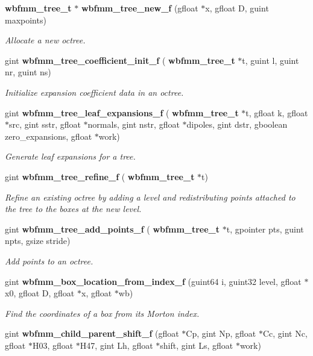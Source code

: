 \begin{DoxyCompactItemize}
\textbf{ wbfmm\+\_\+tree\+\_\+t} $\ast$ \textbf{ wbfmm\+\_\+tree\+\_\+new\+\_\+f} (gfloat $\ast$x, gfloat D, guint maxpoints)
\begin{DoxyCompactList}\small\item\em Allocate a new octree. \end{DoxyCompactList}\item 
gint \textbf{ wbfmm\+\_\+tree\+\_\+coefficient\+\_\+init\+\_\+f} (\textbf{ wbfmm\+\_\+tree\+\_\+t} $\ast$t, guint l, guint nr, guint ns)
\begin{DoxyCompactList}\small\item\em Initialize expansion coefficient data in an octree. \end{DoxyCompactList}\item 
gint \textbf{ wbfmm\+\_\+tree\+\_\+leaf\+\_\+expansions\+\_\+f} (\textbf{ wbfmm\+\_\+tree\+\_\+t} $\ast$t, gfloat k, gfloat $\ast$src, gint sstr, gfloat $\ast$normals, gint nstr, gfloat $\ast$dipoles, gint dstr, gboolean zero\+\_\+expansions, gfloat $\ast$work)
\begin{DoxyCompactList}\small\item\em Generate leaf expansions for a tree. \end{DoxyCompactList}\item 
gint \textbf{ wbfmm\+\_\+tree\+\_\+refine\+\_\+f} (\textbf{ wbfmm\+\_\+tree\+\_\+t} $\ast$t)
\begin{DoxyCompactList}\small\item\em Refine an existing octree by adding a level and redistributing points attached to the tree to the boxes at the new level. \end{DoxyCompactList}\item 
gint \textbf{ wbfmm\+\_\+tree\+\_\+add\+\_\+points\+\_\+f} (\textbf{ wbfmm\+\_\+tree\+\_\+t} $\ast$t, gpointer pts, guint npts, gsize stride)
\begin{DoxyCompactList}\small\item\em Add points to an octree. \end{DoxyCompactList}\item 
gint \textbf{ wbfmm\+\_\+box\+\_\+location\+\_\+from\+\_\+index\+\_\+f} (guint64 i, guint32 level, gfloat $\ast$x0, gfloat D, gfloat $\ast$x, gfloat $\ast$wb)
\begin{DoxyCompactList}\small\item\em Find the coordinates of a box from its Morton index. \end{DoxyCompactList}\item 
gint \textbf{ wbfmm\+\_\+child\+\_\+parent\+\_\+shift\+\_\+f} (gfloat $\ast$Cp, gint Np, gfloat $\ast$Cc, gint Nc, gfloat $\ast$H03, gfloat $\ast$H47, gint Lh, gfloat $\ast$shift, gint Ls, gfloat $\ast$work)

\end{DoxyCompactItemize}
